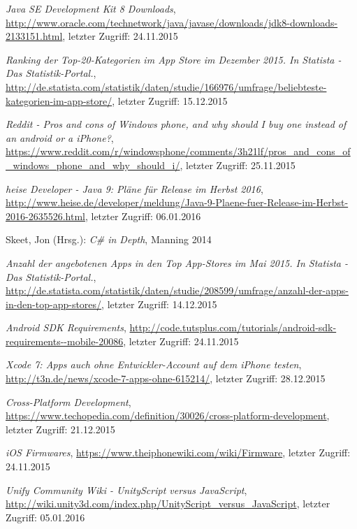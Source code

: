 \begin{thebibliography}{}
\emph{Java SE Development Kit 8 Downloads},
\url{http://www.oracle.com/technetwork/java/javase/downloads/jdk8-downloads-2133151.html}, letzter Zugriff: 24.11.2015

\emph{Ranking der Top-20-Kategorien im App Store im Dezember 2015. In Statista - Das Statistik-Portal.},
\url{http://de.statista.com/statistik/daten/studie/166976/umfrage/beliebteste-kategorien-im-app-store/}, letzter Zugriff: 15.12.2015

\emph{Reddit - Pros and cons of Windows phone, and why should I buy one instead of an android or a iPhone?},
\url{https://www.reddit.com/r/windowsphone/comments/3h21lf/pros_and_cons_of_windows_phone_and_why_should_i/}, letzter Zugriff: 25.11.2015

\emph{heise Developer - Java 9: Pläne für Release im Herbst 2016},
\url{http://www.heise.de/developer/meldung/Java-9-Plaene-fuer-Release-im-Herbst-2016-2635526.html}, letzter Zugriff: 06.01.2016

Skeet, Jon (Hrsg.): 
\emph{C\# in Depth}, Manning 2014

\emph{Anzahl der angebotenen Apps in den Top App-Stores im Mai 2015. In Statista - Das Statistik-Portal.},
\url{http://de.statista.com/statistik/daten/studie/208599/umfrage/anzahl-der-apps-in-den-top-app-stores/}, letzter Zugriff: 14.12.2015

\emph{Android SDK Requirements},
\url{http://code.tutsplus.com/tutorials/android-sdk-requirements--mobile-20086}, letzter Zugriff: 24.11.2015

\emph{Xcode 7: Apps auch ohne Entwickler-Account auf dem iPhone testen},
\url{http://t3n.de/news/xcode-7-apps-ohne-615214/}, letzter Zugriff: 28.12.2015

\emph{Cross-Platform Development},
\url{https://www.techopedia.com/definition/30026/cross-platform-development}, letzter Zugriff: 21.12.2015

\emph{iOS Firmwares},
\url{https://www.theiphonewiki.com/wiki/Firmware}, letzter Zugriff: 24.11.2015

\emph{Unify Community Wiki - UnityScript versus JavaScript},
\url{http://wiki.unity3d.com/index.php/UnityScript_versus_JavaScript}, letzter Zugriff: 05.01.2016


\end{thebibliography}
